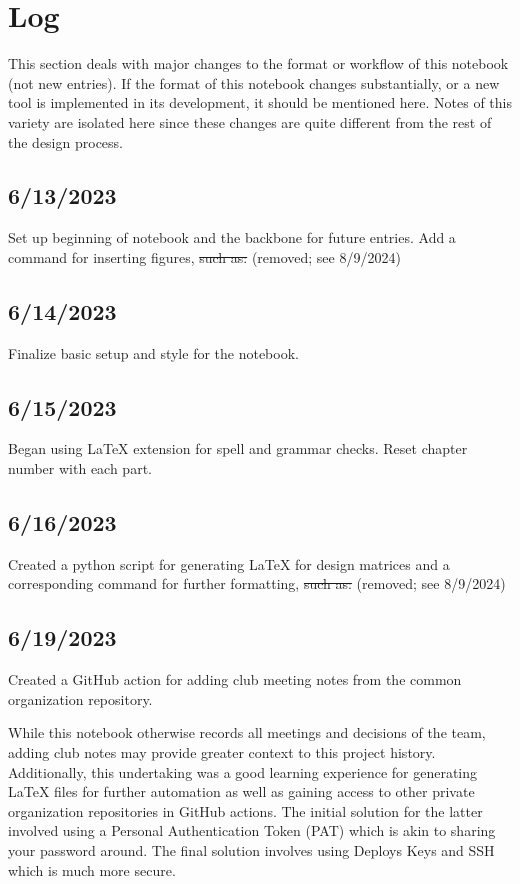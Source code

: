 \section{Log}
This section deals with major changes to the format or workflow of this notebook
(not new entries). If the format of this notebook changes substantially, or a
new tool is implemented in its development, it should be mentioned here. Notes of this variety are isolated here since these changes are quite different from the rest of the design process. 
\subsection{6/13/2023}
Set up beginning of notebook and the backbone for future entries. Add a command
for inserting figures, \sout{such as:} (removed; see 8/9/2024)
\subsection{6/14/2023}
Finalize basic setup and style for the notebook.
\subsection{6/15/2023}
Began using \LaTeX{} \cite{bib:ltex} extension for spell and grammar checks. Reset
chapter number with each part.
\subsection{6/16/2023}
Created a python script for generating \LaTeX{} for design matrices and a
corresponding command for further formatting, \sout{such as:} (removed; see 8/9/2024)
\subsection{6/19/2023}
Created a GitHub action for adding club meeting notes from the common
organization repository.

While this notebook otherwise records all meetings and decisions of the team,
adding club notes may provide greater context to this project history.
Additionally, this undertaking was a good learning experience for generating
\LaTeX{} files for further automation as well as gaining access to other private
organization repositories in GitHub actions. The initial solution for the latter
involved using a Personal Authentication Token (PAT) which is akin to sharing
your password around. The final solution involves using Deploys Keys
and SSH which is much more secure.
